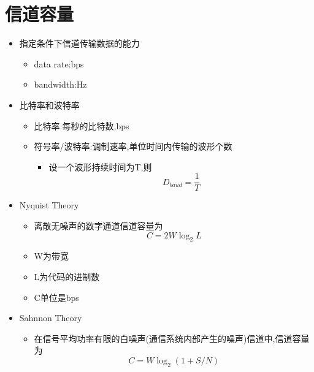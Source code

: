 \documentclass[a4paper,12pt,notitlepage]{article}
\begin{document}
\section{信道容量}
\begin{itemize}
	\item 指定条件下信道传输数据的能力
	\begin{itemize}
		\item data rate:bps
		\item bandwidth:Hz
	\end{itemize}
	\item 比特率和波特率
	\begin{itemize}
		\item 比特率:每秒的比特数,bps
		\item 符号率/波特率:调制速率,单位时间内传输的波形个数
		\begin{itemize}
			\item 设一个波形持续时间为T,则
			\begin{equation}
				D_{baud} = \frac{1}{T}
			\end{equation}
		\end{itemize}
	\end{itemize}
	\item Nyquist Theory
	\begin{itemize}
		\item 离散无噪声的数字通道信道容量为
		\begin{equation}
			C = 2W\log_2L
		\end{equation}
		\item W为带宽
		\item L为代码的进制数
		\item C单位是bps
	\end{itemize}
	\item Sahnnon Theory
	\begin{itemize}
		\item 在信号平均功率有限的白噪声(通信系统内部产生的噪声)信道中,信道容量为
		\begin{equation}
			C = W\log_2(1+S/N)
		\end{equation}
	\end{itemize}
\end{itemize}
\end{document}

